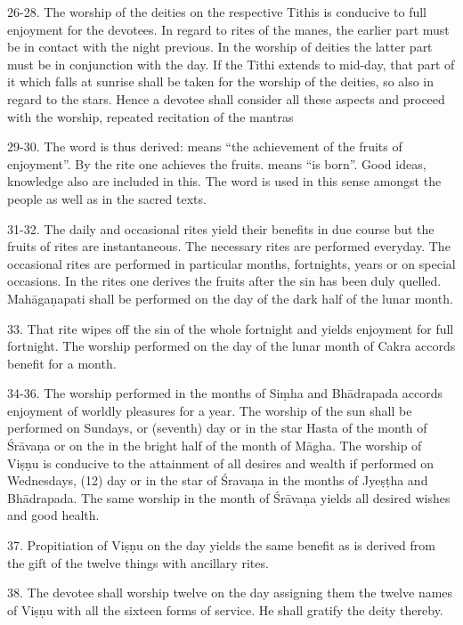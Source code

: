 26-28. The worship of the deities on the respective Tithis \etc is conducive to
full enjoyment for the devotees. In regard to rites of the manes, the earlier
part must be in contact with the night previous. In the worship of deities
the latter part must be in conjunction with the day. If the Tithi extends to
mid-day, that part of it which falls at sunrise shall be taken for the worship
of the deities, so also in regard to the stars. Hence a devotee shall consider
all these aspects and proceed with the worship, repeated recitation of
the mantras \etc

29-30. The word  is thus derived:  means “the achievement of
the fruits of enjoyment”. By the rite one achieves the fruits.  means
“is born”. Good ideas, knowledge \etc also are included in this. The word
 is used in this sense amongst the people as well as in the sacred
texts.

31-32. The daily and occasional rites yield their benefits in due course but
the fruits of  rites are instantaneous. The necessary rites are
performed everyday. The occasional rites are performed in particular months,
fortnights, years or on special occasions. In the  rites one derives
the fruits after the sin has been duly quelled. Mahāgaṇapati  shall be
performed on the  day of the dark half of the lunar month.

33. That rite wipes off the sin of the whole fortnight and yields enjoyment for
full fortnight. The worship performed on the  day of the lunar
month of Cakra accords benefit for a month.

34-36. The worship performed in the months of Siṃha and Bhādrapada accords
enjoyment of worldly pleasures for a year. The worship of the sun shall be
performed on Sundays, or  (seventh) day or in the star Hasta of
the month of Śrāvaṇa or on the  in the bright half of the month
of Māgha. The worship of Viṣṇu is conducive to the attainment of all desires
and wealth if performed on Wednesdays,  (12\th) day or in the star
of Śravaṇa in the months of Jyeṣṭha and Bhādrapada. The same worship in
the month of Śrāvaṇa yields all desired wishes and good health.

37. Propitiation of Viṣṇu on the  day yields the same benefit as is
derived from the gift of the twelve things with ancillary rites.

38. The devotee shall worship twelve  on the  day
assigning them the twelve names of Viṣṇu with all the sixteen forms of service.
He shall gratify the deity thereby.

